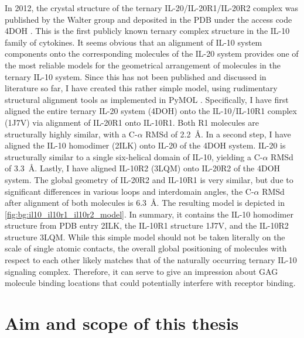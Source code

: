 In 2012, the crystal structure of the ternary IL-20/IL-20R1/IL-20R2 complex was
published by the Walter group and deposited in the PDB under the access code
4DOH \cite{logsdon_il20r2compl_2012}. This is the first publicly known ternary
complex structure in the IL-10 family of cytokines. It seems obvious that an
alignment of IL-10 system components onto the corresponding molecules of the
IL-20 system provides one of the most reliable models for the geometrical
arrangement of molecules in the ternary IL-10 system. Since this has not been
published and discussed in literature so far, I have created this rather simple
model, using rudimentary structural alignment tools as implemented in PyMOL
\cite{pymol}. Specifically, I have first aligned the entire ternary IL-20 system
(4DOH) onto the IL-10/IL-10R1 complex (1J7V) via alignment of IL-20R1 onto
IL-10R1. Both R1 molecules are structurally highly similar, with a C-$\alpha$
RMSd of \SI{2.2}{\angstrom}. In a second step, I have aligned the IL-10
homodimer (2ILK) onto IL-20 of the 4DOH system. IL-20 is structurally similar to
a single six-helical domain of IL-10, yielding a C-$\alpha$ RMSd of
\SI{3.3}{\angstrom}. Lastly, I have aligned IL-10R2 (3LQM) onto IL-20R2 of the
4DOH system. The global geometry of IL-20R2 and IL-10R1 is very similar, but due
to significant differences in various loops and interdomain angles, the
C-$\alpha$ RMSd after alignment of both molecules is \SI{6.3}{\angstrom}. The
resulting model is depicted in \cref{fig:bg:il10_il10r1_il10r2_model}. In
summary, it contains the IL-10 homodimer structure from PDB entry 2ILK, the
IL-10R1 structure 1J7V, and the IL-10R2 structure 3LQM. While this simple model
should not be taken literally on the scale of single atomic contacts, the
overall global positioning of molecules with respect to each other likely
matches that of the naturally occurring ternary IL-10 signaling complex.
Therefore, it can serve to give an impression about GAG molecule binding
locations that could potentially interfere with receptor binding.


\section{Aim and scope of this thesis}

